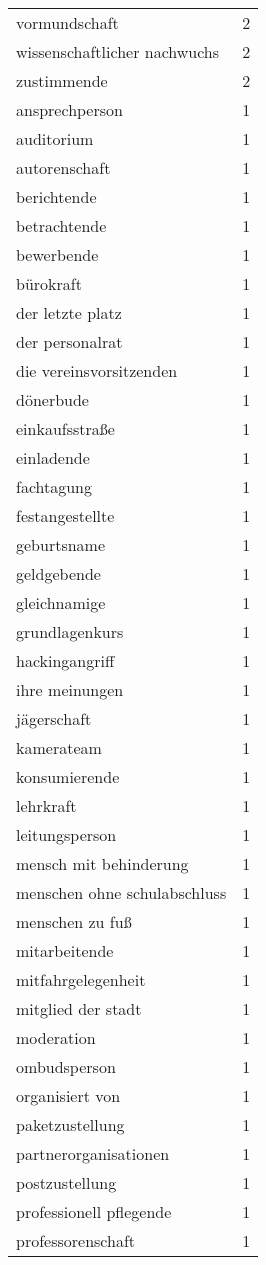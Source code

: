 \begin{tabular}{ll}
vormundschaft & 2\\
wissenschaftlicher nachwuchs & 2\\
zustimmende & 2\\
ansprechperson & 1\\
auditorium & 1\\
autorenschaft & 1\\
berichtende & 1\\
betrachtende & 1\\
bewerbende & 1\\
bürokraft & 1\\
der letzte platz & 1\\
der personalrat & 1\\
die vereinsvorsitzenden & 1\\
dönerbude & 1\\
einkaufsstraße & 1\\
einladende & 1\\
fachtagung & 1\\
festangestellte & 1\\
geburtsname & 1\\
geldgebende & 1\\
gleichnamige & 1\\
grundlagenkurs & 1\\
hackingangriff & 1\\
ihre meinungen & 1\\
jägerschaft & 1\\
kamerateam & 1\\
konsumierende & 1\\
lehrkraft & 1\\
leitungsperson & 1\\
mensch mit behinderung & 1\\
menschen ohne schulabschluss & 1\\
menschen zu fuß & 1\\
mitarbeitende & 1\\
mitfahrgelegenheit & 1\\
mitglied der stadt & 1\\
moderation & 1\\
ombudsperson & 1\\
organisiert von & 1\\
paketzustellung & 1\\
partnerorganisationen & 1\\
postzustellung & 1\\
professionell pflegende & 1\\
professorenschaft & 1\\

\end{tabular}
